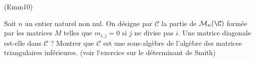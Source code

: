 \begin{tiny}(Emm10)\end{tiny} Soit $n$ un entier naturel non nul. On désigne par $\mathcal C$ la partie de $\mathcal M_n(\C)$ formée par les matrices $M$ telles que $m_{i,j}=0$ si $j$ ne divise pas $i$.\newline
Une matrice diagonale est-elle dans $\mathcal C$ ? Montrer que $\mathcal C$ est une sous-algèbre de l'algèbre des matrices triangulaires inférieures. (voir l`exercice sur le déterminant de Smith) 